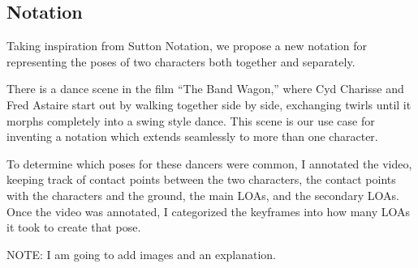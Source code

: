 \subsection{Notation}
Taking inspiration from Sutton Notation, we propose a new notation for representing the poses of two characters both together and separately.

There is a dance scene in the film ``The Band Wagon,'' where Cyd Charisse and Fred Astaire start out by walking together side by side, exchanging twirls until it morphs completely into a swing style dance. This scene is our use case for inventing a notation which extends seamlessly to more than one character.

To determine which poses for these dancers were common, I annotated the video, keeping track of contact points between the two characters, the contact points with the characters and the ground, the main LOAs, and the secondary LOAs. Once the video was annotated, I categorized the keyframes into how many LOAs it took to create that pose. 

NOTE: I am going to add images and an explanation.

